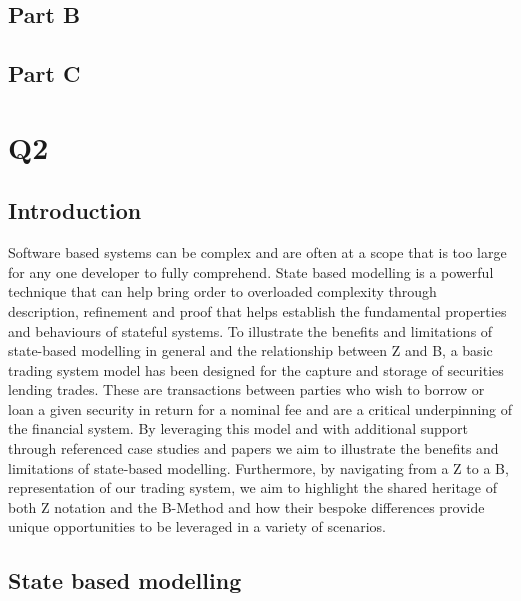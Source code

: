 \documentclass{article}
\begin{document}
\subsection*{Part B}

\pagebreak

\subsection*{Part C}

\pagebreak

\section*{Q2}

\subsection*{Introduction}

Software based systems can be complex and are often at a scope that is too large for any one developer to fully comprehend. State based modelling is a powerful technique that can help bring order to overloaded complexity through description, refinement and proof that helps establish the fundamental properties and behaviours of stateful systems.
\newline \newline
To illustrate the benefits and limitations of state-based modelling in general and the relationship between Z and B, a basic trading system model has been designed for the capture and storage of securities lending trades. These are transactions between parties who wish to borrow or loan a given security in return for a nominal fee and are a critical underpinning of the financial system.
\newline \newline
By leveraging this model and with additional support through referenced case studies and papers we aim to illustrate the benefits and limitations of state-based modelling. Furthermore, by navigating from a Z to a B, representation of our trading system, we aim to highlight the shared heritage of both Z notation and the B-Method and how their bespoke differences provide unique opportunities to be leveraged in a variety of scenarios.

\subsection*{State based modelling}
\end{document}
